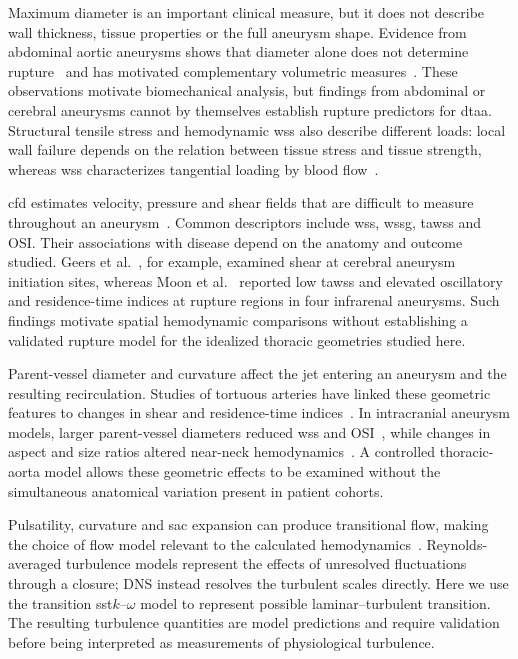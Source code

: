 \documentclass[12pt,a4paper]{article}
\newcommand{\DTAA}{\ac{dtaa}\xspace}
\newcommand{\WSS}{\ac{wss}\xspace}
\newcommand{\WSSG}{\ac{wssg}\xspace}
\newcommand{\TAWSS}{\ac{tawss}\xspace}
\newcommand{\SST}{\ac{sst}\xspace}
\newcommand{\OSI}{\ac{OSI}\xspace}
\newcommand{\DNS}{\ac{DNS}\xspace}
\newcommand{\CFDcap}{\Ac{cfd}\xspace}
\theoremstyle{definition}
\numberwithin{equation}{section}
\begin{document}
Maximum diameter is an important clinical measure, but it does not describe wall thickness, tissue properties or the full aneurysm shape. Evidence from abdominal aortic aneurysms shows that diameter alone does not determine rupture~\cite{darling1977autopsy} and has motivated complementary volumetric measures~\cite{kitagawa2013role}. These observations motivate biomechanical analysis, but findings from abdominal or cerebral aneurysms cannot by themselves establish rupture predictors for \DTAA. Structural tensile stress and hemodynamic \WSS also describe different loads: local wall failure depends on the relation between tissue stress and tissue strength, whereas \WSS characterizes tangential loading by blood flow~\cite{vorp1998mechanical,bilgi2020effects}.

\CFDcap estimates velocity, pressure and shear fields that are difficult to measure throughout an aneurysm~\cite{lee2011computational,morris2016computational}. Common descriptors include \WSS, \WSSG, \TAWSS and \OSI. Their associations with disease depend on the anatomy and outcome studied. Geers et al.~\cite{geers2017wall}, for example, examined shear at cerebral aneurysm initiation sites, whereas Moon et al.~\cite{moon2025hemodynamic} reported low \TAWSS and elevated oscillatory and residence-time indices at rupture regions in four infrarenal aneurysms. Such findings motivate spatial hemodynamic comparisons without establishing a validated rupture model for the idealized thoracic geometries studied here.

Parent-vessel diameter and curvature affect the jet entering an aneurysm and the resulting recirculation. Studies of tortuous arteries have linked these geometric features to changes in shear and residence-time indices~\cite{10a,11a,12a,13a,14a}. In intracranial aneurysm models, larger parent-vessel diameters reduced \WSS and \OSI~\cite{fattahi2023influence,fattahi2023usage}, while changes in aspect and size ratios altered near-neck hemodynamics~\cite{nagargoje2022influence}. A controlled thoracic-aorta model allows these geometric effects to be examined without the simultaneous anatomical variation present in patient cohorts.

Pulsatility, curvature and sac expansion can produce transitional flow, making the choice of flow model relevant to the calculated hemodynamics~\cite{brambila2023influence,evju2015assumption,luciano2024turbulent,rawat2019numerical}. Reynolds-averaged turbulence models represent the effects of unresolved fluctuations through a closure; \DNS instead resolves the turbulent scales directly. Here we use the transition \SST $k$--$\omega$ model to represent possible laminar--turbulent transition. The resulting turbulence quantities are model predictions and require validation before being interpreted as measurements of physiological turbulence.
\end{document}
